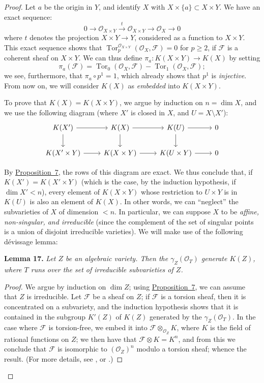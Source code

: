 \documentclass{article}
\newenvironment{itenv}[1]
  {\phantomsection\par\medskip\noindent\textbf{#1.}\itshape}
  {\par\medskip}
\newcommand{\scr}[1]{{\mathscr{#1}}}
\renewcommand{\geq}{\geqslant}
\DeclareMathOperator{\Tor}{Tor}
\newcommand{\oldpage}[1]{\marginpar{\footnotesize$\Big\vert$ \textit{p.~#1}}}
\begin{document}
\begin{proof}
  Let $a$ be the origin in $Y$, and identify $X$ with $X\times\{a\}\subset X\times Y$.
  We have an exact sequence:
  \[
    0 \to \scr{O}_{X\times Y} \xrightarrow{t} \scr{O}_{X\times Y} \to \scr{O}_X \to 0
  \]
  where $t$ denotes the projection $X\times Y\to Y$, considered as a function to $X\times Y$.
  This exact sequence shows that $\Tor_p^{\scr{O}_{X\times Y}}(\scr{O}_X,\scr{F})=0$ for $p\geq2$, if $\scr{F}$ is a coherent sheaf on $X\times Y$.
  We can thus define $\pi_a\colon K(X\times Y)\to K(X)$ by setting
  \[
    \pi_a(\scr{F}) = \Tor_0(\scr{O}_X,\scr{F}) - \Tor_1(\scr{O}_X,\scr{F});
  \]
  we see, furthermore, that $\pi_a\circ p^1=1$, which already shows that $p^1$ is \emph{injective}.
  From now on, we will consider $K(X)$ as \emph{embedded} into $K(X\times Y)$.

  To prove that $K(X)=K(X\times Y)$, we argue by induction on $n=\dim X$, and we use the following diagram (where $X'$ is closed in $X$, and $U=X\setminus X'$):
  \[
    \begin{tikzcd}
      K(X') \rar \dar
      & K(X) \rar \dar
      & K(U) \rar \dar
      & 0
    \\K(X'\times Y) \rar
      & K(X\times Y) \rar
      & K(U\times Y) \rar
      & 0
    \end{tikzcd}
  \]

\oldpage{117}
  By \hyperref[proposition7]{Proposition~7}, the rows of this diagram are exact.
  We thus conclude that, if $K(X')=K(X'\times Y)$ (which is the case, by the induction hypothesis, if $\dim X'<n$), every element of $K(X\times Y)$ whose restriction to $U\times Y$ is in $K(U)$ is also an element of $K(X)$.
  In other words, we can ``neglect'' the subvarieties of $X$ of dimension $<n$.
  In particular, we can suppose $X$ to be \emph{affine, non-singular, and irreducible} (since the complement of the set of singular points is a union of disjoint irreducible varieties).
  We will make use of the following d\'{e}vissage lemma:

  \begin{itenv}{Lemma 17}
  \label{lemma17}
    Let $Z$ be an algebraic variety.
    Then the $\gamma_Z(\scr{O}_T)$ generate $K(Z)$, where $T$ runs over the set of irreducible subvarieties of $Z$.
  \end{itenv}

  \begin{proof}
    We argue by induction on $\dim Z$;
    using \hyperref[proposition7]{Proposition~7}, we can assume that $Z$ is irreducible.
    Let $\scr{F}$ be a sheaf on $Z$;
    if $\scr{F}$ is a torsion sheaf, then it is concentrated on a subvariety, and the induction hypothesis shows that it is contained in the subgroup $K'(Z)$ of $K(Z)$ generated by the $\gamma_Z(\scr{O}_T)$.
    In the case where $\scr{F}$ is torsion-free, we embed it into $\scr{F}\otimes_{\scr{O}_Z}K$, where $K$ is the field of rational functions on $Z$;
    we then have that $\scr{F}\otimes K=K^n$, and from this we conclude that $\scr{F}$ is isomorphic to $(\scr{O}_Z)^n$ modulo a torsion sheaf;
    whence the result.
    (For more details, see \cite{14}, or \cite{6}.)
  \end{proof}


\end{proof}
\end{document}
